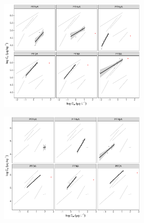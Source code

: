 \begin{figure}
    \centering
        \begin{subfigure}[t]{\linewidth}
            \centering
            \includegraphics[width=0.8\textwidth]{R/figs/ULS_facet_isotherm.pdf}
            \label{fig:ULS_isotherm}
        \end{subfigure}
        \begin{subfigure}[]{\linewidth}
            \centering
            \includegraphics[width=0.8\textwidth]{R/figs/DSL_facet_isotherm.pdf}
            \label{fig:DSL_isotherm}
        \end{subfigure}   
\end{figure}
